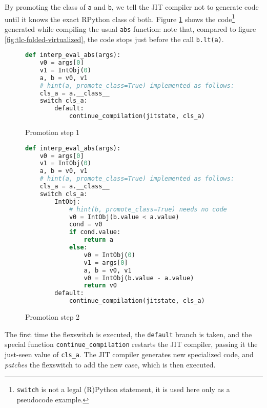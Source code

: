 By promoting the class of \lstinline{a} and \lstinline{b}, we tell the JIT
compiler not to generate code until it knows the exact RPython class of both.
Figure \ref{fig:tlc-abs-promotion-1} shows the
code\footnote{\lstinline{switch} is not a legal (R)Python statement, it is
  used here only as a pseudocode example.} generated while compiling the usual
\lstinline{abs} function: note that, compared to figure
\ref{fig:tlc-folded-virtualized}, the code stops just before the call
\lstinline{b.lt(a)}.

\begin{figure}[h]
\begin{center}
\begin{lstlisting}[language=Python]
def interp_eval_abs(args):
    v0 = args[0]
    v1 = IntObj(0)
    a, b = v0, v1
    # hint(a, promote_class=True) implemented as follows:
    cls_a = a.__class__
    switch cls_a:
        default: 
            continue_compilation(jitstate, cls_a)
\end{lstlisting}
\caption{Promotion step 1}
\label{fig:tlc-abs-promotion-1}
\end{center}
\end{figure}

\begin{figure}[h]
\begin{center}
\begin{lstlisting}[language=Python]
def interp_eval_abs(args):
    v0 = args[0]
    v1 = IntObj(0)
    a, b = v0, v1
    # hint(a, promote_class=True) implemented as follows:
    cls_a = a.__class__
    switch cls_a:
        IntObj:
            # hint(b, promote_class=True) needs no code
            v0 = IntObj(b.value < a.value)
            cond = v0
            if cond.value:
                return a
            else:
                v0 = IntObj(0)
                v1 = args[0]
                a, b = v0, v1
                v0 = IntObj(b.value - a.value)
                return v0
        default: 
            continue_compilation(jitstate, cls_a)
\end{lstlisting}
\caption{Promotion step 2}
\label{fig:tlc-abs-promotion-2}
\end{center}
\end{figure}

The first time the flexswitch is executed, the \lstinline{default} branch is
taken, and the special function \lstinline{continue_compilation} restarts the
JIT compiler, passing it the just-seen value of \lstinline{cls_a}.  The JIT
compiler generates new specialized code, and \emph{patches} the flexswitch to
add the new case, which is then executed.

